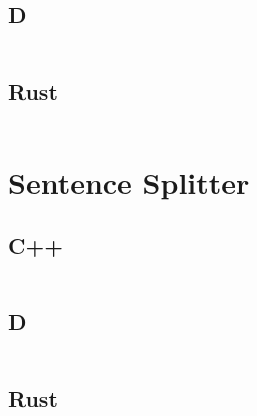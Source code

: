 \documentclass[draftcopy,nolof,nolot]{srpaper}
\begin{document}
\subsection{D}
\begin{mdframed}[linecolor=black]
\inputminted{d}{../examples/hello-world/hello_world.d}
\end{mdframed}

\subsection{Rust}
\begin{mdframed}[linecolor=black]
\inputminted{rust}{../examples/hello-world/hello_world.rs}
\end{mdframed}

\section{Sentence Splitter}
\subsection{C++}
\begin{mdframed}[linecolor=black]
\inputminted[fontsize=\scriptsize]{cpp}{../examples/sentence-splitter/sentence_splitter.cpp}
\end{mdframed}

\subsection{D}
\begin{mdframed}[linecolor=black]
\inputminted[fontsize=\scriptsize]{d}{../examples/sentence-splitter/sentence_splitter.d}
\end{mdframed}

\subsection{Rust}
\begin{mdframed}[linecolor=black]
\inputminted[fontsize=\scriptsize]{rust}{../examples/sentence-splitter/sentence_splitter.rs}
\end{mdframed}
\end{document}
